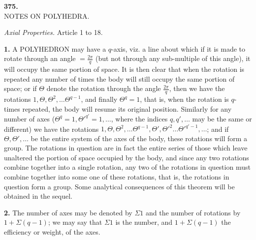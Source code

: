 \documentclass[11pt]{article}
\begin{document}
\begin{center}\textbf{375.}\\[2pt]
NOTES ON POLYHEDRA.\end{center}


\medskip

\noindent\emph{Axial Properties.} Article 1 to 18.

\medskip

\textbf{1.} A POLYHEDRON may have a $q$-axis, viz. a line about which if it is made to rotate through an angle $= \tfrac{2\pi}{q}$ (but not through any sub-multiple of this angle), it will occupy the same portion of space. It is then clear that when the rotation is repeated any number of times the body will still occupy the same portion of space; or if $\Theta$ denote the rotation through the angle $\tfrac{2\pi}{q}$, then we have the rotations $1, \Theta, \Theta^2, \ldots \Theta^{q-1}$, and finally $\Theta^q = 1$, that is, when the rotation is $q$-times repeated, the body will resume its original position. Similarly for any number of axes ($\Theta^q = 1, \Theta'^{q'} = 1, \ldots$, where the indices $q, q', \ldots$ may be the same or different) we have the rotations $1, \Theta, \Theta^2, \ldots \Theta^{q-1}, \Theta', \Theta'^2 \ldots \Theta'^{q'-1}, \ldots$; and if $\Theta, \Theta', \ldots$ be the entire system of the axes of the body, these rotations will form a group. The rotations in question are in fact the entire series of those which leave unaltered the portion of space occupied by the body, and since any two rotations combine together into a single rotation, any two of the rotations in question must combine together into some one of these rotations, that is, the rotations in question form a group. Some analytical consequences of this theorem will be obtained in the sequel.

\textbf{2.} The number of axes may be denoted by $\Sigma 1$ and the number of rotations by $1 + \Sigma(q - 1)$; we may say that $\Sigma 1$ is the number, and $1 + \Sigma(q - 1)$ the efficiency or weight, of the axes.
\end{document}

